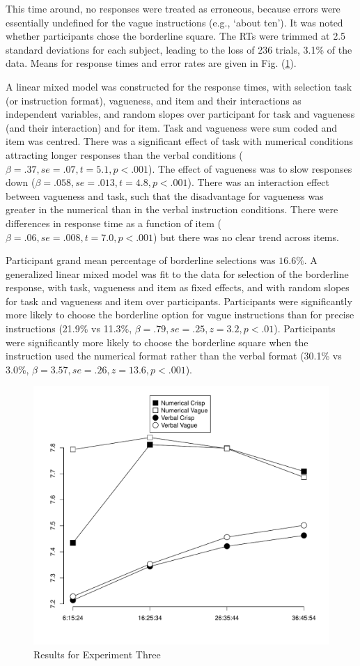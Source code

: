 \documentclass[doc,apacite]{apa6}
\begin{document}
This time around, no responses were treated as erroneous, because errors were essentially undefined for the vague instructions (e.g., `about ten'). It was noted whether participants chose the borderline square. 
%
The RTs were trimmed at 2.5 standard deviations for each subject, leading to the loss of 236 trials, 3.1\% of the data. Means for response times and error rates are given in Fig. (\ref{resultse3}).

A linear mixed model was constructed for the response times, with selection task (or instruction format), vagueness, and item and their interactions as independent variables, and random slopes over participant for task and vagueness (and their interaction) and for item. Task and vagueness were sum coded and item was centred. There was a significant effect of task with numerical conditions attracting longer responses than the verbal conditions ($\beta=.37, se=.07, t=5.1, p<.001$). The effect of vagueness was to slow responses down  ($\beta=.058, se=.013, t=4.8, p<.001$). There was an interaction effect between vagueness and task, such that the disadvantage for vagueness was greater in the numerical than in the verbal instruction conditions.  There were differences in response time as a function of item ($\beta=.06, se=.008, t=7.0, p<.001$) but there was no clear trend across items.

Participant grand mean percentage of borderline selections was $16.6\%$. A generalized linear mixed model \cite{jaeger2008categorical} was fit to the data for selection of the borderline response, with task, vagueness and item as fixed effects, and with random slopes for task and vagueness and item over participants.  Participants were significantly more likely to choose the borderline option for vague instructions than for precise instructions (21.9\% vs 11.3\%, $\beta=.79, se=.25, z=3.2, p<.01$). Participants were significantly more likely to choose the borderline square when the instruction used the numerical format rather than the verbal format (30.1\% vs 3.0\%, $\beta=3.57, se=.26, z=13.6, p<.001$). 

\begin{figure}[htbp]
\centering
\includegraphics[width=.65\textwidth]{images/resultse3.pdf}
\caption{Results for Experiment Three}
\label{resultse3}
\end{figure}
\end{document}
